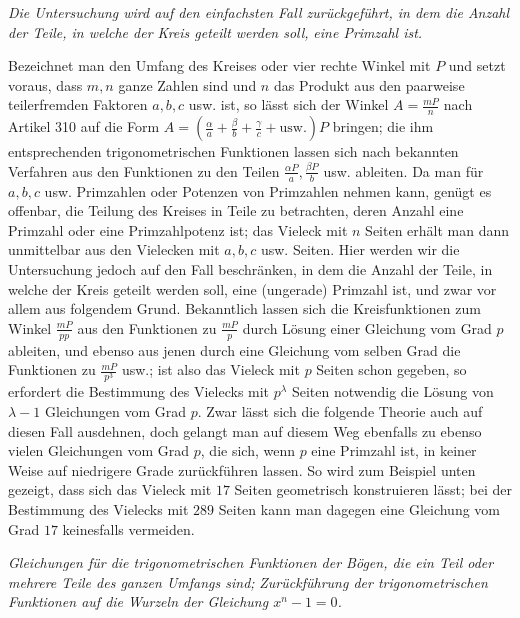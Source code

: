 \begin{center}\textit{Die Untersuchung wird auf den einfachsten Fall zurückgeführt, in dem die Anzahl der Teile, in welche der Kreis geteilt werden soll,} \textit{eine Primzahl ist.}\end{center}


Bezeichnet man den Umfang des Kreises oder vier rechte Winkel mit \(P\) und setzt voraus, dass \(m,\allowbreak n\) ganze Zahlen sind und \(n\) das Produkt aus den paarweise teilerfremden Faktoren \(a,\allowbreak b,\allowbreak c\) usw. ist, so lässt sich der Winkel \(A=\frac{mP}{n}\) nach Artikel 310 auf die Form \(A=(\frac\alpha a+\frac\beta b+\frac\gamma c+\mathrm{usw.})P\) bringen; die ihm entsprechenden trigonometrischen Funktionen lassen sich nach bekannten Verfahren aus den Funktionen zu den Teilen \(\frac{\alpha P}a,\allowbreak \frac{\beta P}b\) usw. ableiten. Da man für \(a,\allowbreak b,\allowbreak c\) usw. Primzahlen oder Potenzen von Primzahlen nehmen kann, genügt es offenbar, die Teilung des Kreises in Teile zu betrachten, deren Anzahl eine Primzahl oder eine Primzahlpotenz ist; das Vieleck mit \(n\) Seiten erhält man dann unmittelbar aus den Vielecken mit \(a,\allowbreak b,\allowbreak c\) usw. Seiten. Hier werden wir die Untersuchung jedoch auf den Fall beschränken, in dem die Anzahl der Teile, in welche der Kreis geteilt werden soll, eine (ungerade) Primzahl ist, und zwar vor allem aus folgendem Grund. Bekanntlich lassen sich die Kreisfunktionen zum Winkel \(\frac{mP}{pp}\) aus den Funktionen zu \(\frac{mP}p\) durch Lösung einer Gleichung vom Grad \(p\) ableiten, und ebenso aus jenen durch eine Gleichung vom selben Grad die Funktionen zu \(\frac{mP}{p^3}\) usw.; ist also das Vieleck mit \(p\) Seiten schon gegeben, so erfordert die Bestimmung des Vielecks mit \(p^\lambda\) Seiten notwendig die Lösung von \(\lambda-1\) Gleichungen vom Grad \(p\). Zwar lässt sich die folgende Theorie auch auf diesen Fall ausdehnen, doch gelangt man auf diesem Weg ebenfalls zu ebenso vielen Gleichungen vom Grad \(p\), die sich, wenn \(p\) eine Primzahl ist, in keiner Weise auf niedrigere Grade zurückführen lassen. So wird zum Beispiel unten gezeigt, dass sich das Vieleck mit \(17\) Seiten geometrisch konstruieren lässt; bei der Bestimmung des Vielecks mit \(289\) Seiten kann man dagegen eine Gleichung vom Grad \(17\) keinesfalls vermeiden.

\begin{center}\textit{Gleichungen für die trigonometrischen Funktionen der Bögen, die ein Teil oder mehrere Teile des ganzen Umfangs sind;} \textit{Zurückführung der trigonometrischen Funktionen auf die Wurzeln der Gleichung \(x^n-1=0\).}\end{center}


